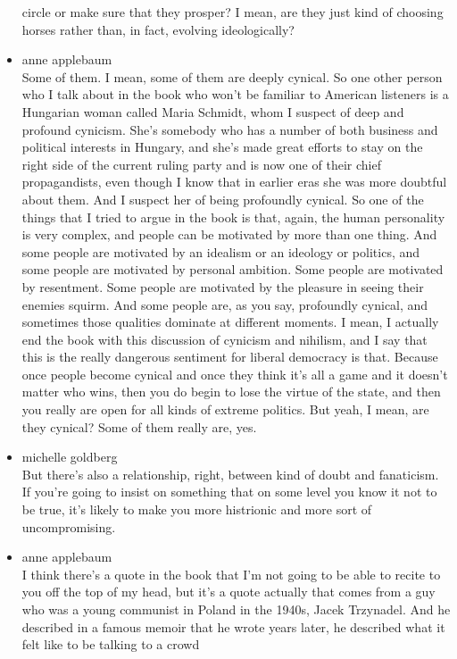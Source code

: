 \begin{itemize}
  circle or make sure that they prosper? I mean, are they just kind of
  choosing horses rather than, in fact, evolving ideologically?
\item
  anne applebaum\\
  Some of them. I mean, some of them are deeply cynical. So one other
  person who I talk about in the book who won't be familiar to American
  listeners is a Hungarian woman called Maria Schmidt, whom I suspect of
  deep and profound cynicism. She's somebody who has a number of both
  business and political interests in Hungary, and she's made great
  efforts to stay on the right side of the current ruling party and is
  now one of their chief propagandists, even though I know that in
  earlier eras she was more doubtful about them. And I suspect her of
  being profoundly cynical. So one of the things that I tried to argue
  in the book is that, again, the human personality is very complex, and
  people can be motivated by more than one thing. And some people are
  motivated by an idealism or an ideology or politics, and some people
  are motivated by personal ambition. Some people are motivated by
  resentment. Some people are motivated by the pleasure in seeing their
  enemies squirm. And some people are, as you say, profoundly cynical,
  and sometimes those qualities dominate at different moments. I mean, I
  actually end the book with this discussion of cynicism and nihilism,
  and I say that this is the really dangerous sentiment for liberal
  democracy is that. Because once people become cynical and once they
  think it's all a game and it doesn't matter who wins, then you do
  begin to lose the virtue of the state, and then you really are open
  for all kinds of extreme politics. But yeah, I mean, are they cynical?
  Some of them really are, yes.
\item
  michelle goldberg\\
  But there's also a relationship, right, between kind of doubt and
  fanaticism. If you're going to insist on something that on some level
  you know it not to be true, it's likely to make you more histrionic
  and more sort of uncompromising.
\item
  anne applebaum\\
  I think there's a quote in the book that I'm not going to be able to
  recite to you off the top of my head, but it's a quote actually that
  comes from a guy who was a young communist in Poland in the 1940s,
  Jacek Trzynadel. And he described in a famous memoir that he wrote
  years later, he described what it felt like to be talking to a crowd

\end{itemize}
